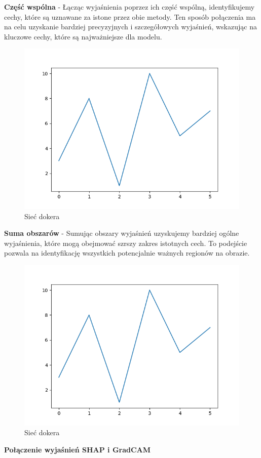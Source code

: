 \textbf{Część wspólna} - Łącząc wyjaśnienia poprzez ich część wspólną, identyfikujemy cechy, które są uznawane za istone przez obie metody.
Ten sposób połączenia ma na celu uzyskanie bardziej precyzyjnych i szczegółowych wyjaśnień, wskazując na kluczowe cechy, które są najważniejsze dla modelu.
\begin{figure}
  \centering\includegraphics[width=.6\textwidth]{images/example}
\caption{Sieć dokera \cite{docker_compose_reference}}  \label{rys:network}
\end{figure}

\textbf{Suma obszarów} - Sumując obszary wyjaśnień uzyskujemy bardziej ogólne wyjaśnienia, które mogą obejmować szrszy zakres istotnych cech.
To podejście pozwala na identyfikację wszystkich potencjalnie ważnych regionów na obrazie.
\begin{figure}
  \centering\includegraphics[width=.6\textwidth]{images/example}
\caption{Sieć dokera \cite{docker_compose_reference}}  \label{rys:network}
\end{figure}

\textbf{Połączenie wyjaśnień SHAP i GradCAM}

